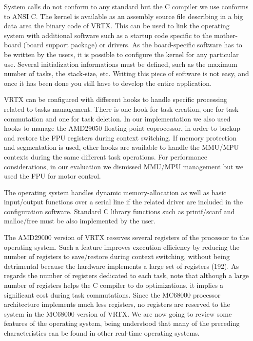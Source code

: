 \documentclass[10pt]{report}
\begin{document}
System calls do not conform to any standard but the C compiler we
use conforms to ANSI C. The kernel is available as an assembly
source file describing in a big data area the binary code of VRTX. 
This can be used to link the operating system with additional
software such as a startup code specific to the mother-board 
(board support package) or drivers. As the board-specific software
has to be written by the users, it is possible to configure the kernel
for any particular use. Several initialization informations must be
defined, such as the maximum number of tasks, the stack-size, etc. Writing
this piece of software is not easy, and once it has been done you still have to
develop the entire application.

VRTX can be configured with different hooks to handle specific
processing related to tasks management. There is one hook for
task creation, one for task commutation and one for task
deletion. In our implementation we also used hooks to manage the
AMD29050 floating-point coprocessor, in order to backup and
restore the FPU registers during context switching. If memory protection and segmentation 
is used, other hooks are available to handle the MMU/MPU contexts during the same different task
operations. For performance considerations, in our evaluation we dismissed MMU/MPU
management but we used the FPU for motor control.

The operating system handles dynamic memory-allocation as well as basic
input/output functions over a serial line if the related driver are
included in the configuration software. Standard C library
functions such as printf/scanf and malloc/free must be also
implemented by the user.

The AMD29000 version of VRTX reserves several registers of the processor 
to the operating system. Such a feature improves execution efficiency by reducing the number of
registers to save/restore during context switching, without being detrimental because
the hardware implements a large set of registers (192). As regards
the number of registers dedicated to each task, note that
although a large number of registers helps the C compiler to do
optimizations, it implies a significant cost during task commutations. 
Since the MC68000 processor architecture implements much less registers, no registers are reserved 
to the system in the MC68000 version of VRTX. We are now going to review some
features of the operating system, being understood that many of
the preceding characteristics can be found in other real-time operating systems.
\end{document}
